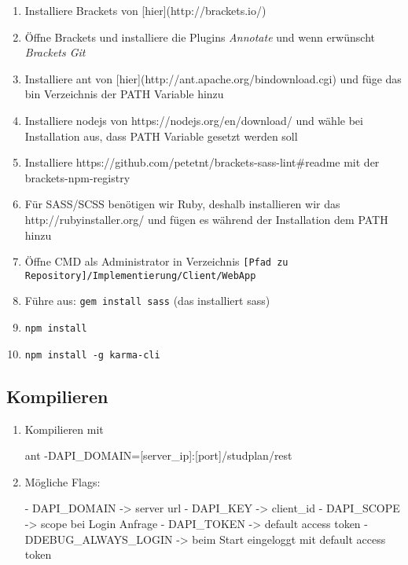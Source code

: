 \begin{enumerate}
\item Installiere Brackets von [hier](http://brackets.io/)
\item Öffne Brackets und installiere die Plugins \textit{Annotate} und wenn erwünscht \textit{Brackets Git}
\item Installiere ant von [hier](http://ant.apache.org/bindownload.cgi) und füge das bin Verzeichnis der PATH Variable hinzu
\item Installiere nodejs von https://nodejs.org/en/download/ und wähle bei Installation aus, dass PATH Variable gesetzt werden soll
\item Installiere https://github.com/petetnt/brackets-sass-lint\#readme mit der brackets-npm-registry
\item Für SASS/SCSS benötigen wir Ruby, deshalb installieren wir das http://rubyinstaller.org/ und fügen es während der Installation dem PATH hinzu
\item Öffne CMD als Administrator in Verzeichnis \texttt{[Pfad zu Repository]/Implementierung/Client/WebApp}
\item Führe aus: \texttt{gem install sass} (das installiert sass)
\item \texttt{npm install}
\item \texttt{npm install -g karma-cli}
\end{enumerate}

\subsection{Kompilieren}
\begin{enumerate}
	\item Kompilieren mit 
	\begin{json}
	ant -DAPI\_DOMAIN=[server\_ip]:[port]/studplan/rest 
	\end{json}
	\item Mögliche Flags:
	\begin{json}
	- DAPI\_DOMAIN -> server url
	- DAPI\_KEY -> client\_id
	- DAPI\_SCOPE -> scope bei Login Anfrage
	- DAPI\_TOKEN -> default access token
	- DDEBUG\_ALWAYS\_LOGIN -> beim Start eingeloggt mit default access token
	\end{json}
\end{enumerate}


